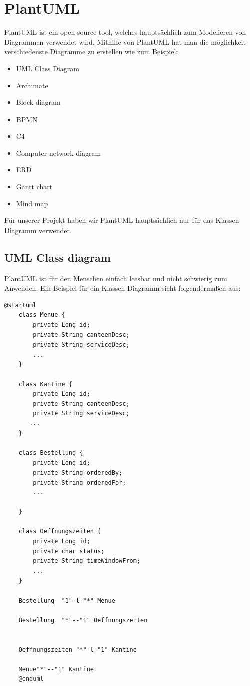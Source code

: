 \pagebreak

\section{PlantUML}

PlantUML ist ein open-source tool, welches hauptsächlich zum Modelieren von Diagrammen verwendet wird. Mithilfe von 
PlantUML hat man die möglichkeit verschiedenste Diagramme zu erstellen wie zum Beispiel:

\begin{itemize}
    \item UML Class Diagram
    \item Archimate
    \item Block diagram
    \item BPMN
    \item C4
    \item Computer network diagram 
    \item ERD
    \item Gantt chart
    \item Mind map 
\end{itemize}

Für unserer Projekt haben wir PlantUML hauptsächlich nur für das Klassen Diagramm verwendet. \cite{PlantUML} 

\pagebreak

\subsection{UML Class diagram}

PlantUML ist für den Menschen einfach leesbar und nicht schwierig zum Anwenden. 
Ein Beispiel für ein Klassen Diagramm sieht folgendermaßen aus:

\begin{lstlisting}[caption=Simple PlantUML example,label=lst:impl:foo]
    @startuml
    class Menue {
        private Long id;
        private String canteenDesc;
        private String serviceDesc;
        ...
    }
    
    class Kantine {
        private Long id;
        private String canteenDesc;
        private String serviceDesc;
       ...
    }
    
    class Bestellung {
        private Long id;
        private String orderedBy;
        private String orderedFor;
        ...
        
    }
    
    class Oeffnungszeiten {
        private Long id;
        private char status;
        private String timeWindowFrom;
        ...
    }
    
    Bestellung  "1"-l-"*" Menue
    
    Bestellung  "*"--"1" Oeffnungszeiten 
    
    
    Oeffnungszeiten "*"-l-"1" Kantine 
    
    Menue"*"--"1" Kantine 
    @enduml
\end{lstlisting}

